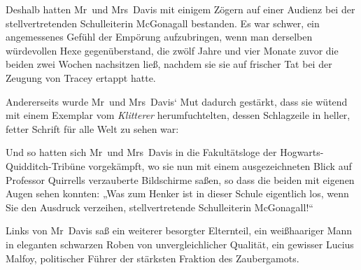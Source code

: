 Deshalb hatten Mr~und Mrs~Davis mit einigem Zögern auf einer Audienz bei der stellvertretenden Schulleiterin McGonagall bestanden. Es war schwer, ein angemessenes Gefühl der Empörung aufzubringen, wenn man derselben würdevollen Hexe gegenüberstand, die zwölf Jahre und vier Monate zuvor die beiden zwei Wochen nachsitzen ließ, nachdem sie sie auf frischer Tat bei der Zeugung von Tracey ertappt hatte.

Andererseits wurde Mr~und Mrs~Davis‘ Mut dadurch gestärkt, dass sie wütend mit einem Exemplar vom \emph{Klitterer} herumfuchtelten, dessen Schlagzeile in heller, fetter Schrift für alle Welt zu sehen war:


Und so hatten sich Mr~und Mrs~Davis in die Fakultätsloge der Hogwarts-Quidditch-Tribüne vorgekämpft, wo sie nun mit einem ausgezeichneten Blick auf Professor Quirrells verzauberte Bildschirme saßen, so dass die beiden mit eigenen Augen sehen konnten: „Was zum Henker ist in dieser Schule eigentlich los, wenn Sie den Ausdruck verzeihen, stellvertretende Schulleiterin McGonagall!“

Links von Mr~Davis saß ein weiterer besorgter Elternteil, ein weißhaariger Mann in eleganten schwarzen Roben von unvergleichlicher Qualität, ein gewisser Lucius Malfoy, politischer Führer der stärksten Fraktion des Zaubergamots.

